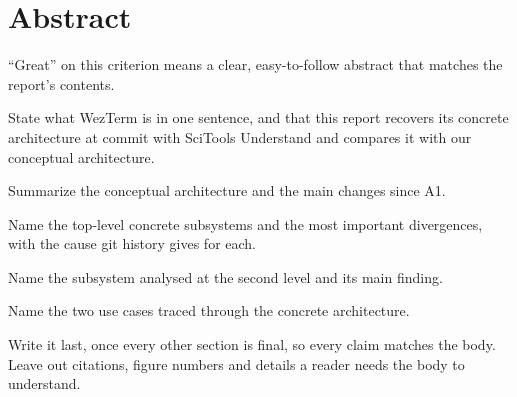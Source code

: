 \section*{Abstract}
\label{sec:abstract}


\begin{requirements}
  \item ``Great'' on this criterion means a clear, easy-to-follow abstract that matches the report's contents.
  \item State what WezTerm is in one sentence, and that this report recovers its concrete architecture at commit \pinnedcommit{} with SciTools Understand and compares it with our conceptual architecture.
  \item Summarize the conceptual architecture and the main changes since A1.
  \item Name the top-level concrete subsystems and the most important divergences, with the cause git history gives for each.
  \item Name the subsystem analysed at the second level and its main finding.
  \item Name the two use cases traced through the concrete architecture.
  \item Write it last, once every other section is final, so every claim matches the body. Leave out citations, figure numbers and details a reader needs the body to understand.
\end{requirements}
